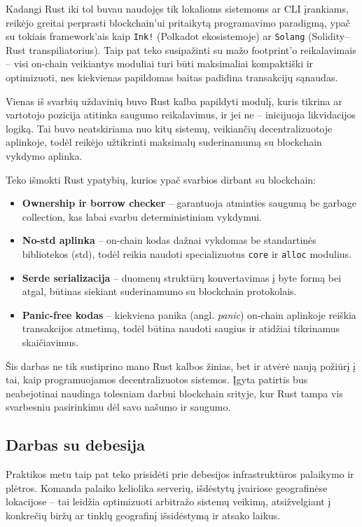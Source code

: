 \documentclass[]{VUMIFTemplateClass}
\begin{document}
Kadangi Rust iki tol buvau naudojęs tik lokalioms sistemoms ar CLI įrankiams, reikėjo greitai perprasti blockchain’ui pritaikytą programavimo paradigmą, ypač su tokiais framework’ais kaip \texttt{Ink!} (Polkadot ekosistemoje) ar \texttt{Solang} (Solidity–Rust transpiliatorius). Taip pat teko susipažinti su mažo footprint’o reikalavimais – visi on-chain veikiantys moduliai turi būti maksimaliai kompaktiški ir optimizuoti, nes kiekvienas papildomas baitas padidina transakcijų sąnaudas.

Vienas iš svarbių uždavinių buvo Rust kalba papildyti modulį, kuris tikrina ar vartotojo pozicija atitinka saugumo reikalavimus, ir jei ne – inicijuoja likvidacijos logiką. Tai buvo neatskiriama nuo kitų sistemų, veikiančių decentralizuotoje aplinkoje, todėl reikėjo užtikrinti maksimalų suderinamumą su blockchain vykdymo aplinka.

Teko išmokti Rust ypatybių, kurios ypač svarbios dirbant su blockchain:

\begin{itemize}
  \item \textbf{Ownership ir borrow checker} – garantuoja atminties saugumą be garbage collection, kas labai svarbu deterministiniam vykdymui.
  \item \textbf{No-std aplinka} – on-chain kodas dažnai vykdomas be standartinės bibliotekos (std), todėl reikia naudoti specializuotus \texttt{core} ir \texttt{alloc} modulius.
  \item \textbf{Serde serializacija} – duomenų struktūrų konvertavimas į byte formą bei atgal, būtinas siekiant suderinamumo su blockchain protokolais.
  \item \textbf{Panic-free kodas} – kiekviena panika (angl. \textit{panic}) on-chain aplinkoje reiškia transakcijos atmetimą, todėl būtina naudoti saugius ir atidžiai tikrinamus skaičiavimus.
\end{itemize}

Šis darbas ne tik sustiprino mano Rust kalbos žinias, bet ir atvėrė naują požiūrį į tai, kaip programuojamos decentralizuotos sistemos. Įgyta patirtis bus neabejotinai naudinga tolesniam darbui blockchain srityje, kur Rust tampa vis svarbesniu pasirinkimu dėl savo našumo ir saugumo.

\subsection{Darbas su debesija}
Praktikos metu taip pat teko prisidėti prie debesijos infrastruktūros palaikymo ir plėtros. Komanda palaiko keliolika serverių, išdėstytų įvairiose geografinėse lokacijose – tai leidžia optimizuoti arbitražo sistemų veikimą, atsižvelgiant į konkrečių biržų ar tinklų geografinį išsidėstymą ir atsako laikus.
\end{document}
